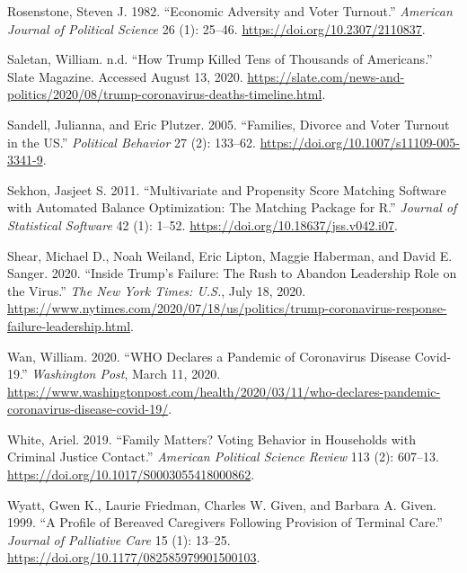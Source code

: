 \documentclass[
  12pt,
]{article}
\newlength{\cslhangindent}
\newenvironment{cslreferences}%
  {\setlength{\parindent}{0pt}%
  \everypar{\setlength{\hangindent}{\cslhangindent}}\ignorespaces}%
  {\par}
\begin{document}
\begin{cslreferences}
\leavevmode\hypertarget{ref-Rosenstone1982}{}%
Rosenstone, Steven J. 1982. ``Economic Adversity and Voter Turnout.'' \emph{American Journal of Political Science} 26 (1): 25--46. \url{https://doi.org/10.2307/2110837}.

\leavevmode\hypertarget{ref-Saletan2020}{}%
Saletan, William. n.d. ``How Trump Killed Tens of Thousands of Americans.'' Slate Magazine. Accessed August 13, 2020. \url{https://slate.com/news-and-politics/2020/08/trump-coronavirus-deaths-timeline.html}.

\leavevmode\hypertarget{ref-Sandell2005}{}%
Sandell, Julianna, and Eric Plutzer. 2005. ``Families, Divorce and Voter Turnout in the US.'' \emph{Political Behavior} 27 (2): 133--62. \url{https://doi.org/10.1007/s11109-005-3341-9}.

\leavevmode\hypertarget{ref-Sekhon2011}{}%
Sekhon, Jasjeet S. 2011. ``Multivariate and Propensity Score Matching Software with Automated Balance Optimization: The Matching Package for R.'' \emph{Journal of Statistical Software} 42 (1): 1--52. \url{https://doi.org/10.18637/jss.v042.i07}.

\leavevmode\hypertarget{ref-Shear2020}{}%
Shear, Michael D., Noah Weiland, Eric Lipton, Maggie Haberman, and David E. Sanger. 2020. ``Inside Trump's Failure: The Rush to Abandon Leadership Role on the Virus.'' \emph{The New York Times: U.S.}, July 18, 2020. \url{https://www.nytimes.com/2020/07/18/us/politics/trump-coronavirus-response-failure-leadership.html}.

\leavevmode\hypertarget{ref-Wan2020}{}%
Wan, William. 2020. ``WHO Declares a Pandemic of Coronavirus Disease Covid-19.'' \emph{Washington Post}, March 11, 2020. \url{https://www.washingtonpost.com/health/2020/03/11/who-declares-pandemic-coronavirus-disease-covid-19/}.

\leavevmode\hypertarget{ref-White2019a}{}%
White, Ariel. 2019. ``Family Matters? Voting Behavior in Households with Criminal Justice Contact.'' \emph{American Political Science Review} 113 (2): 607--13. \url{https://doi.org/10.1017/S0003055418000862}.

\leavevmode\hypertarget{ref-Wyatt1999}{}%
Wyatt, Gwen K., Laurie Friedman, Charles W. Given, and Barbara A. Given. 1999. ``A Profile of Bereaved Caregivers Following Provision of Terminal Care.'' \emph{Journal of Palliative Care} 15 (1): 13--25. \url{https://doi.org/10.1177/082585979901500103}.
\end{cslreferences}
\end{document}
